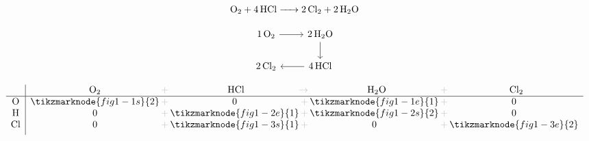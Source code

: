 \documentclass{ctexart}
\newcommand{\grayplus}{\,\color{lightgray}+\,}
\newcommand{\grayto}{\,\color{lightgray}\to\,}
\newcommand{\arrowLR}[3]{%
    \draw[->|,red,thick]
    ([xshift=2pt]#1.south east)
    .. controls ++(0.3cm,-0.2cm) and ++(-0.3cm,-0.2cm) ..
    ([xshift=-2pt]#2.south west)
    node[midway,below,blue,font=\small] {#3};
}
\newcommand{\arrowRL}[3]{%
    \draw[->|,red,thick]
    ([xshift=-2pt]#1.south west)
    .. controls ++(-0.3cm,-0.2cm) and ++(0.3cm,-0.2cm) ..
    ([xshift=2pt]#2.south east)
    node[midway,below,blue,font=\small] {#3};
}
\begin{document}
\setlength{\arraycolsep}{8pt}
\renewcommand\arraystretch{1.5}
\begin{center}
    \noindent
    \begin{minipage}[c]{0.4\textwidth}
        \[
            \ce{O2 + 4 HCl -> 2 Cl2 + 2 H2O}
        \]

        \[
            \begin{tikzcd}
                \ce{1O2} \arrow[r] & \ce{2H2O} \arrow[d] \\
                \ce{2Cl2} & \ce{4HCl} \arrow[l]
            \end{tikzcd}
        \]
    \end{minipage}%
    \hspace{0.01\textwidth}
    \begin{minipage}[c]{0.4\textwidth}
        \[
            \begin{array}{c|*{3}{c@{\grayplus}}c}
                & \multicolumn{1}{c@{\grayplus}}{\ce{O2}} &
                \multicolumn{1}{c@{\grayto}}{\ce{HCl}} &
                \multicolumn{1}{c@{\grayplus}}{\ce{H2O}} &
                \multicolumn{1}{c}{\ce{Cl2}} \\
                \hline
                \ce{O} & \tikzmarknode{fig1-1s}{2} & 0 &
                \tikzmarknode{fig1-1e}{1} & 0\\
                \ce{H} & 0 & \tikzmarknode{fig1-2e}{1} &
                \tikzmarknode{fig1-2s}{2} & 0\\
                \ce{Cl} & 0 & \tikzmarknode{fig1-3s}{1} & 0 &
                \tikzmarknode{fig1-3e}{2}\\[1ex]
            \end{array}
        \]
    \end{minipage}
\end{center}

\end{document}
